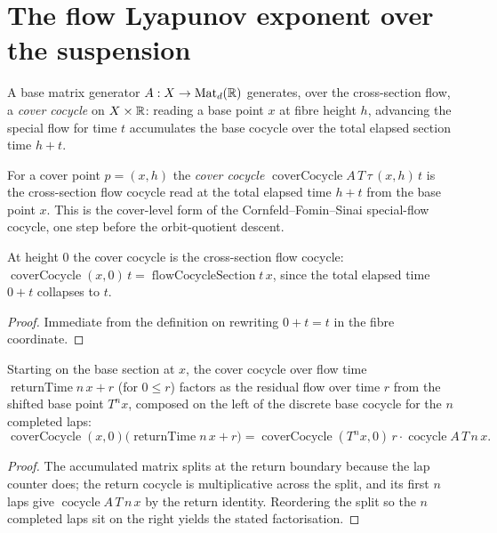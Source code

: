 \section{The flow Lyapunov exponent over the suspension}

A base matrix generator $A : X \to \operatorname{Mat}_d(\mathbb{R})$ generates, over the cross-section
flow, a \emph{cover cocycle} on $X \times \mathbb{R}$: reading a base point $x$ at fibre height $h$,
advancing the special flow for time $t$ accumulates the base cocycle over the total elapsed
section time $h + t$.

\begin{definition}\label{thm:susp-coverCocycle}
  \leanok
  For a cover point $p = (x, h)$ the \emph{cover cocycle}
  $\operatorname{coverCocycle} A\,T\,\tau\,(x, h)\,t$ is the cross-section flow cocycle read at
  the total elapsed time $h + t$ from the base point $x$. This is the cover-level form of the
  Cornfeld--Fomin--Sinai special-flow cocycle, one step before the orbit-quotient descent.
\end{definition}

\begin{lemma}\label{thm:susp-coverBase}
  \leanok
  At height $0$ the cover cocycle is the cross-section flow cocycle:
  $\operatorname{coverCocycle}(x, 0)\,t = \operatorname{flowCocycleSection} t\,x$, since the
  total elapsed time $0 + t$ collapses to $t$.
\end{lemma}
\begin{proof}\leanok
  Immediate from the definition on rewriting $0 + t = t$ in the fibre coordinate.
\end{proof}

\begin{theorem}\label{thm:susp-coverReturn}
  \leanok
  Starting on the base section at $x$, the cover cocycle over flow time
  $\operatorname{returnTime} n\,x + r$ (for $0 \le r$) factors as the residual flow over time
  $r$ from the shifted base point $T^n x$, composed on the left of the discrete base cocycle
  for the $n$ completed laps:
  \[
    \operatorname{coverCocycle}(x, 0)\bigl(\operatorname{returnTime} n\,x + r\bigr)
      = \operatorname{coverCocycle}(T^n x, 0)\,r \cdot \operatorname{cocycle} A\,T\,n\,x.
  \]
\end{theorem}
\begin{proof}\leanok
  The accumulated matrix splits at the return boundary because the lap counter does; the return
  cocycle is multiplicative across the split, and its first $n$ laps give
  $\operatorname{cocycle} A\,T\,n\,x$ by the return identity. Reordering the split so the $n$
  completed laps sit on the right yields the stated factorisation.
\end{proof}

